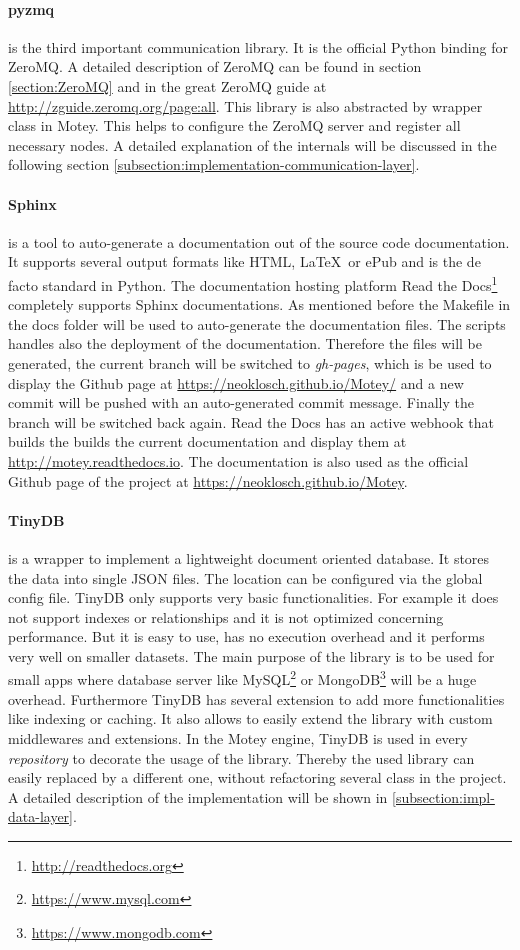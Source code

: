 \paragraph{pyzmq} is the third important communication library.
It is the official Python binding for ZeroMQ.
A detailed description of ZeroMQ can be found in section \ref{section:ZeroMQ} and in the great ZeroMQ guide at \url{http://zguide.zeromq.org/page:all}.
This library is also abstracted by wrapper class in Motey.
This helps to configure the ZeroMQ server and register all necessary nodes.
A detailed explanation of the internals will be discussed in the following section \ref{subsection:implementation-communication-layer}.

\paragraph{Sphinx} is a tool to auto-generate a documentation out of the source code documentation.
It supports several output formats like \ac{HTML}, \LaTeX\ or ePub and is the de facto standard in Python.
The documentation hosting platform Read the Docs\footnote{\url{http://readthedocs.org}} completely supports Sphinx documentations.
As mentioned before the Makefile in the docs folder will be used to auto-generate the documentation files.
The scripts handles also the deployment of the documentation.
Therefore the files will be generated, the current branch will be switched to \textit{gh-pages}, which is be used to display the Github page at \url{https://neoklosch.github.io/Motey/} and a new commit will be pushed with an auto-generated commit message.
Finally the branch will be switched back again.
Read the Docs has an active webhook that builds the builds the current documentation and display them at \url{http://motey.readthedocs.io}.
The documentation is also used as the official Github page of the project at \url{https://neoklosch.github.io/Motey}.

\paragraph{TinyDB} is a wrapper to implement a lightweight document oriented database.
It stores the data into single \ac{JSON} files.
The location can be configured via the global config file.
TinyDB only supports very basic functionalities.
For example it does not support indexes or relationships and it is not optimized concerning performance.
But it is easy to use, has no execution overhead and it performs very well on smaller datasets.
The main purpose of the library is to be used for small apps where database server like MySQL\footnote{\url{https://www.mysql.com}} or MongoDB\footnote{\url{https://www.mongodb.com}} will be a huge overhead.
Furthermore TinyDB has several extension to add more functionalities like indexing or caching.
It also allows to easily extend the library with custom middlewares and extensions.
In the Motey engine, TinyDB is used in every \textit{repository} to decorate the usage of the library.
Thereby the used library can easily replaced by a different one, without refactoring several class in the project.
A detailed description of the implementation will be shown in \ref{subsection:impl-data-layer}.

